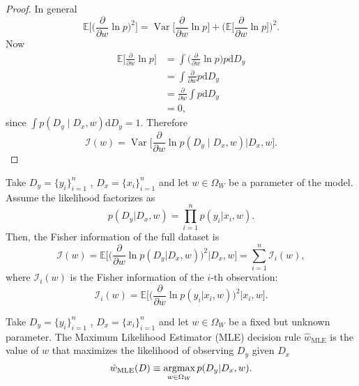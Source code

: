 \begin{proof}
	In general
	\begin{equation}
		\mathbb{E}\bigg[\bigg(\frac{\partial}{\partial w} \ln p\bigg)^2\bigg] 
		= \operatorname{Var}\bigg[\frac{\partial}{\partial w} \ln p\bigg] + 
		\bigg(\mathbb{E}\bigg[\frac{\partial}{\partial w} \ln p\bigg]\bigg)^2.
	\end{equation}
	Now
	\begin{align}
		\mathbb{E}\bigg[\frac{\partial}{\partial w} \ln p\bigg] 
		&= \int \bigg(\frac{\partial}{\partial w} \ln p\bigg)  p \mathrm{d}D_y \\
		&= \int \frac{\partial}{\partial w} p \mathrm{d}D_y\\
		&= \frac{\partial}{\partial w} \int  p \mathrm{d}D_y \\
		&= 0,
	\end{align}
	since $\int p(D_y \mid D_x, w) \mathrm{d}D_y = 1$. Therefore
	\begin{equation}
		\mathcal{I}(w) = \operatorname{Var}\bigg[\frac{\partial}{\partial w} \ln p(D_y \mid D_x, w) \bigg| D_x, w\bigg].
	\end{equation}
\end{proof}

\begin{theorem}
	\label{thm:fisher_sample}
	Take $D_y= \{y_i\}_{i=1}^n$ , $D_x = \{x_i\}_{i=1}^n$ and let $w \in \Omega_W$ be a parameter of the model. Assume the likelihood factorizes as
	\begin{equation}
		p(D_y | D_x, w) = \prod_{i=1}^{n} p(y_i | x_i, w).
	\end{equation}
	Then, the Fisher information of the full dataset is
	\begin{equation}
		\mathcal{I}(w) 
		= \mathbb{E}\Bigg[\Big(\frac{\partial}{\partial w} \ln p(D_y | D_x, w)\Big)^2 \Bigg| D_x, w \Bigg] 
		= \sum_{i=1}^{n} \mathcal{I}_i(w),
	\end{equation}
	where $\mathcal{I}_i(w)$ is the Fisher information of the $i$-th observation:
	\begin{equation}
		\mathcal{I}_i(w) = \mathbb{E}\Bigg[\Bigg(\frac{\partial}{\partial w} \ln p(y_i | x_i, w)\Bigg)^2 \Bigg| x_i, w\Bigg].
	\end{equation}
\end{theorem}

\begin{definition}
	\label{def:MLE}
	Take $D_y= \{y_i\}_{i=1}^n$ , $D_x = \{x_i\}_{i=1}^n$ and let $w \in \Omega_W$ be a fixed but unknown parameter. The Maximum Likelihood Estimator (MLE) decision rule  $\hat{w}_{\mathrm{MLE}}$ is the value of $w$ that maximizes the likelihood of observing $D_y$ given $D_x$
	\begin{equation}
		\hat{w}_{\mathrm{MLE}}(D) \equiv \operatorname*{argmax}_{w \in \Omega_W} p(D_y | D_x, w).
	\end{equation}
\end{definition}

